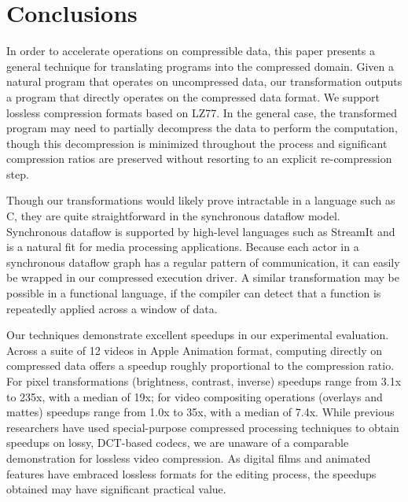 \section{Conclusions}
\label{sec:conclusions}


In order to accelerate operations on compressible data, this paper
presents a general technique for translating programs into the
compressed domain.  Given a natural program that operates on
uncompressed data, our transformation outputs a program that directly
operates on the compressed data format.  We support lossless
compression formats based on LZ77.  In the general case, the
transformed program may need to partially decompress the data to
perform the computation, though this decompression is minimized
throughout the process and significant compression ratios are
preserved without resorting to an explicit re-compression step.

Though our transformations would likely prove intractable in a
language such as C, they are quite straightforward in the synchronous
dataflow model.  Synchronous dataflow is supported by high-level
languages such as StreamIt and is a natural fit for media processing
applications.  Because each actor in a synchronous dataflow graph has
a regular pattern of communication, it can easily be wrapped in our
compressed execution driver.  A similar transformation may be possible
in a functional language, if the compiler can detect that a function
is repeatedly applied across a window of data.

Our techniques demonstrate excellent speedups in our experimental
evaluation.  Across a suite of 12 videos in Apple Animation format,
computing directly on compressed data offers a speedup roughly
proportional to the compression ratio.  For pixel transformations
(brightness, contrast, inverse) speedups range from 3.1x to 235x, with
a median of 19x; for video compositing operations (overlays and
mattes) speedups range from 1.0x to 35x, with a median of 7.4x.  While
previous researchers have used special-purpose compressed processing
techniques to obtain speedups on lossy, DCT-based codecs, we are
unaware of a comparable demonstration for lossless video compression.
As digital films and animated features have embraced lossless formats
for the editing process, the speedups obtained may have significant
practical value.

